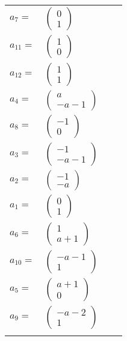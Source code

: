 \documentclass[1p]{elsarticle_modified}
\theoremstyle{definition}
\begin{document}
\begin{tabular}{m{7pt} m{180pt} m{7pt} m{180pt} }
\flushright $a_{7}=$&$\begin{pmatrix}0\\1\end{pmatrix}$ \\
\flushright $a_{11}=$&$\begin{pmatrix}1\\0\end{pmatrix}$ \\
\flushright $a_{12}=$&$\begin{pmatrix}1\\1\end{pmatrix}$ \\
\flushright $a_{4}=$&$\begin{pmatrix}a\\- a-1\end{pmatrix}$ \\
\flushright $a_{8}=$&$\begin{pmatrix}-1\\0\end{pmatrix}$ \\
\flushright $a_{3}=$&$\begin{pmatrix}-1\\- a-1\end{pmatrix}$ \\
\flushright $a_{2}=$&$\begin{pmatrix}-1\\- a\end{pmatrix}$ \\
\flushright $a_{1}=$&$\begin{pmatrix}0\\1\end{pmatrix}$ \\
\flushright $a_{6}=$&$\begin{pmatrix}1\\a+1\end{pmatrix}$ \\
\flushright $a_{10}=$&$\begin{pmatrix}- a-1\\1\end{pmatrix}$ \\
\flushright $a_{5}=$&$\begin{pmatrix}a+1\\0\end{pmatrix}$ \\
\flushright $a_{9}=$&$\begin{pmatrix}- a-2\\1\end{pmatrix}$\\&\end{tabular}
\end{document}

